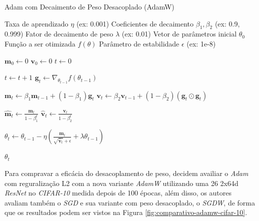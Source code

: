 \begin{algorithm}[H]
    \caption{Adam com Decaimento de Peso Desacoplado (AdamW)}
    \label{alg:adamw}
    \begin{algorithmic}[1]

    \Require Taxa de aprendizado $\eta$ (ex: 0.001)
    \Require Coeficientes de decaimento $\beta_1, \beta_2$ (ex: 0.9, 0.999)
    \Require Fator de decaimento de peso $\lambda$ (ex: 0.01)
    \Require Vetor de parâmetros inicial $\theta_0$
    \Require Função a ser otimizada $f(\theta)$
    \Require Parâmetro de estabilidade $\epsilon$ (ex: 1e-8)

    \State $\mathbf{m}_0 \leftarrow 0$ 
    \State $\mathbf{v}_0 \leftarrow 0$ 
    \State $t \leftarrow 0$ 

        \State $t \leftarrow t + 1$
        \State $\mathbf{g}_t \leftarrow \nabla_{\theta_{t-1}} f(\theta_{t-1})$ 
        
        \State $\mathbf{m}_t \leftarrow \beta_1 \mathbf{m}_{t-1} + (1 - \beta_1) \mathbf{g}_t$
        \State $\mathbf{v}_t \leftarrow \beta_2 \mathbf{v}_{t-1} + (1 - \beta_2) (\mathbf{g}_t \odot \mathbf{g}_t)$
        
        \State $\mathbf{\hat{m}}_t \leftarrow \frac{\mathbf{m}_t}{1 - \beta_1^t}$
        \State $\mathbf{\hat{v}}_t \leftarrow \frac{\mathbf{v}_t}{1 - \beta_2^t}$
        
        \State $\theta_t \leftarrow \theta_{t-1} - \eta \left( \frac{\mathbf{\hat{m}}_t}{\sqrt{\mathbf{\hat{v}}_t} + \epsilon} + \lambda \theta_{t-1} \right)$
    \EndWhile

    \State \Return $\theta_t$ 
    \end{algorithmic}
\end{algorithm}

Para compravar a eficácia do desacoplamento de peso, \textcite{AdamWMethod} decidem availiar o \textit{Adam} com reguralização L2 com a nova variante \textit{AdamW} utilizando uma 26 2x64d \textit{ResNet} no \textit{CIFAR-10} medida depois de 100 épocas, além disso, os autores avaliam também o \textit{SGD} e sua variante com peso desacoplado, o \textit{SGDW}, de forma que os resultados podem ser vistos na Figura \ref{fig:comparativo-adamw-cifar-10}.


